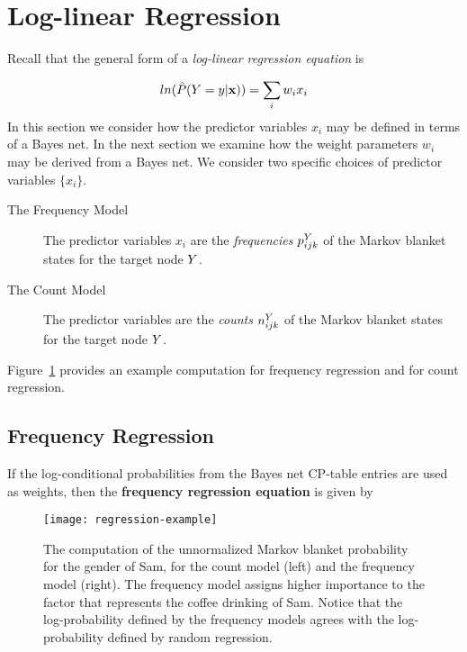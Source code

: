 \documentclass[twoside,leqno,twocolumn]{article}
\begin{document}

\section{Log-linear Regression}

Recall that the general form of a {\em log-linear regression equation} is

$$ln(\tilde{P}(Y = y|\mathbf{x}))= \sum_{i} w_{i} x_{i}
$$
In this section we consider how the predictor variables $x_{i}$ may be defined in terms of a Bayes net. In the next section we examine how the weight parameters $w_{i}$ may be derived from a Bayes net.
%
We consider two specific choices of predictor variables $\{x_{i}\}$. 


\begin{description}
\item[The Frequency Model] The predictor variables $x_{i}$ are the {\em frequencies} $p^{Y}_{ijk}$ of the Markov blanket states for the target node $Y$.
\item[The Count Model] The predictor variables are the {\em counts} $n^{Y}_{ijk}$ of the Markov blanket states for the target node $Y$. 
\end{description}

Figure~\ref{fig:regress-example} provides an example computation for frequency regression and for count regression. 

\subsection{Frequency Regression}
If the log-conditional probabilities from the Bayes net CP-table entries are used as weights, then the \textbf{frequency regression equation} is given by



\begin{figure}[htpb]
\begin{center}
\texttt{[image: regression-example]}
\caption{%
The computation of the unnormalized Markov blanket probability for the gender of Sam, for the count model (left) and the frequency model (right). The frequency model assigns higher importance to the factor that represents the coffee drinking of Sam. Notice that the log-probability defined by the frequency models agrees with the log-probability defined by random regression.
 \label{fig:regress-example}}
\end{center}
\end{figure}
\end{document}
